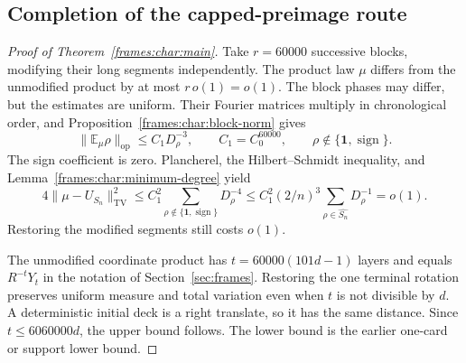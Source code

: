 \subsection{Completion of the capped-preimage route}
\label{frames:char:amplification}

\begin{proof}[Proof of Theorem~\ref{frames:char:main}]
Take $r=60000$ successive blocks, modifying their long segments
independently. The product law $\mu$ differs from the unmodified product
by at most $r\,o(1)=o(1)$. The block phases may differ, but the estimates
are uniform. Their Fourier matrices multiply in chronological order,
and Proposition~\ref{frames:char:block-norm} gives
\[
 \|\mathbb E_\mu\rho\|_{\mathrm{op}}
 \le C_1D_\rho^{-3},
 \qquad C_1=C_0^{60000},
 \qquad \rho\notin\{\mathbf1,\operatorname{sign}\}.
\]
The sign coefficient is zero. Plancherel, the Hilbert--Schmidt inequality,
and Lemma~\ref{frames:char:minimum-degree} yield
\[
 4\|\mu-U_{S_n}\|_{\mathrm{TV}}^2
 \le C_1^2\sum_{\rho\notin\{\mathbf1,\operatorname{sign}\}}D_\rho^{-4}
 \le C_1^2(2/n)^3\sum_{\rho\in\widehat{S_n}}D_\rho^{-1}=o(1).
\]
Restoring the modified segments still costs $o(1)$.

The unmodified coordinate product has
$t=60000(101d-1)$ layers and equals $R^{-t}Y_t$ in the notation of
Section~\ref{sec:frames}. Restoring the one terminal rotation preserves
uniform measure and total variation even when $t$ is not divisible by
$d$. A deterministic initial deck is a right translate, so it has the
same distance. Since $t\le6060000d$, the upper bound follows. The lower
bound is the earlier one-card or support lower bound.
\end{proof}
